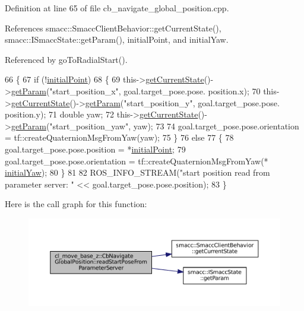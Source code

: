 Definition at line 65 of file cb\+\_\+navigate\+\_\+global\+\_\+position.\+cpp.



References smacc\+::\+Smacc\+Client\+Behavior\+::get\+Current\+State(), smacc\+::\+I\+Smacc\+State\+::get\+Param(), initial\+Point, and initial\+Yaw.



Referenced by go\+To\+Radial\+Start().


\begin{DoxyCode}
66 \{
67     \textcolor{keywordflow}{if} (!\hyperlink{classcl__move__base__z_1_1CbNavigateGlobalPosition_afc5b0337f06dc4c51026e0c0646b8645}{initialPoint})
68     \{
69         this->\hyperlink{classsmacc_1_1SmaccClientBehavior_abf6773e4dd948f932f11a346dd6e7c2c}{getCurrentState}()->\hyperlink{classsmacc_1_1ISmaccState_abbb3a24b912c6e8de28f7b86123b6357}{getParam}(\textcolor{stringliteral}{"start\_position\_x"}, goal.target\_pose.pose.
      position.x);
70         this->\hyperlink{classsmacc_1_1SmaccClientBehavior_abf6773e4dd948f932f11a346dd6e7c2c}{getCurrentState}()->\hyperlink{classsmacc_1_1ISmaccState_abbb3a24b912c6e8de28f7b86123b6357}{getParam}(\textcolor{stringliteral}{"start\_position\_y"}, goal.target\_pose.pose.
      position.y);
71         \textcolor{keywordtype}{double} yaw;
72         this->\hyperlink{classsmacc_1_1SmaccClientBehavior_abf6773e4dd948f932f11a346dd6e7c2c}{getCurrentState}()->\hyperlink{classsmacc_1_1ISmaccState_abbb3a24b912c6e8de28f7b86123b6357}{getParam}(\textcolor{stringliteral}{"start\_position\_yaw"}, yaw);
73 
74         goal.target\_pose.pose.orientation = tf::createQuaternionMsgFromYaw(yaw);
75     \}
76     \textcolor{keywordflow}{else}
77     \{
78         goal.target\_pose.pose.position = *\hyperlink{classcl__move__base__z_1_1CbNavigateGlobalPosition_afc5b0337f06dc4c51026e0c0646b8645}{initialPoint};
79         goal.target\_pose.pose.orientation = tf::createQuaternionMsgFromYaw(*
      \hyperlink{classcl__move__base__z_1_1CbNavigateGlobalPosition_a09f1cf00473ae1f90b974f49a1c31086}{initialYaw});
80     \}
81 
82     ROS\_INFO\_STREAM(\textcolor{stringliteral}{"start position read from parameter server: "} << goal.target\_pose.pose.position);
83 \}
\end{DoxyCode}
Here is the call graph for this function\+:
\nopagebreak
\begin{figure}[H]
\begin{center}
\leavevmode
\includegraphics[width=350pt]{classcl__move__base__z_1_1CbNavigateGlobalPosition_a868b25f238e3781c9a2e44b4e1502fcc_cgraph}
\end{center}
\end{figure}
